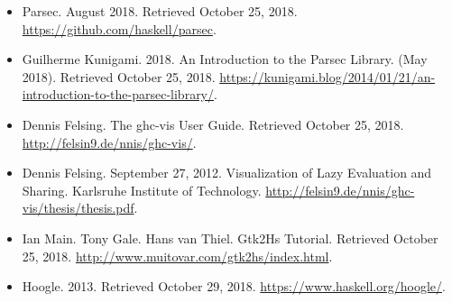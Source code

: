 \begin{itemize}
    \item Parsec. August 2018. Retrieved October 25, 2018. \url{https://github.com/haskell/parsec}.
    \item Guilherme Kunigami. 2018. An Introduction to the Parsec Library. (May 2018). Retrieved October 25, 2018. \url{https://kunigami.blog/2014/01/21/an-introduction-to-the-parsec-library/}.
    \item Dennis Felsing. The ghc-vis User Guide. Retrieved October 25, 2018. \url{http://felsin9.de/nnis/ghc-vis/}.
    \item Dennis Felsing. September 27, 2012. Visualization of Lazy Evaluation and Sharing. Karlsruhe Institute of Technology. \url{http://felsin9.de/nnis/ghc-vis/thesis/thesis.pdf}.
    \item Ian Main. Tony Gale. Hans van Thiel. Gtk2Hs Tutorial. Retrieved October 25, 2018.
    \url{http://www.muitovar.com/gtk2hs/index.html}.
    \item Hoogle. 2013. Retrieved October 29, 2018. \url{https://www.haskell.org/hoogle/}.
\end{itemize}
